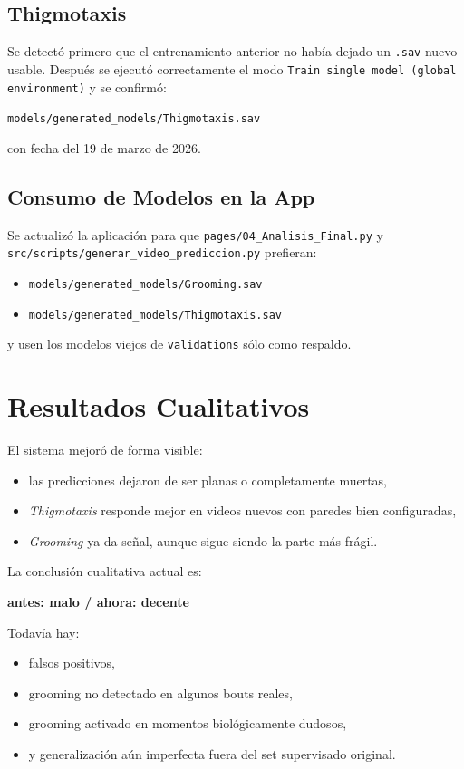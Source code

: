 \documentclass[12pt,a4paper]{article}
\begin{document}
\subsection{Thigmotaxis}
Se detect\'o primero que el entrenamiento anterior no hab\'ia dejado un \texttt{.sav} nuevo usable. Despu\'es se ejecut\'o correctamente el modo \texttt{Train single model (global environment)} y se confirm\'o:
\begin{center}
\texttt{models/generated\_models/Thigmotaxis.sav}
\end{center}

con fecha del 19 de marzo de 2026.

\subsection{Consumo de Modelos en la App}
Se actualiz\'o la aplicaci\'on para que \texttt{pages/04\_Analisis\_Final.py} y \texttt{src/scripts/generar\_video\_prediccion.py} prefieran:
\begin{itemize}[leftmargin=1.5cm]
    \item \texttt{models/generated\_models/Grooming.sav}
    \item \texttt{models/generated\_models/Thigmotaxis.sav}
\end{itemize}

y usen los modelos viejos de \texttt{validations} s\'olo como respaldo.

\section{Resultados Cualitativos}
El sistema mejor\'o de forma visible:
\begin{itemize}[leftmargin=1.5cm]
    \item las predicciones dejaron de ser planas o completamente muertas,
    \item \textit{Thigmotaxis} responde mejor en videos nuevos con paredes bien configuradas,
    \item \textit{Grooming} ya da se\~nal, aunque sigue siendo la parte m\'as fr\'agil.
\end{itemize}

La conclusi\'on cualitativa actual es:
\begin{center}
\textbf{antes: malo / ahora: decente}
\end{center}

Todav\'ia hay:
\begin{itemize}[leftmargin=1.5cm]
    \item falsos positivos,
    \item grooming no detectado en algunos bouts reales,
    \item grooming activado en momentos biol\'ogicamente dudosos,
    \item y generalizaci\'on a\'un imperfecta fuera del set supervisado original.
\end{itemize}
\end{document}
